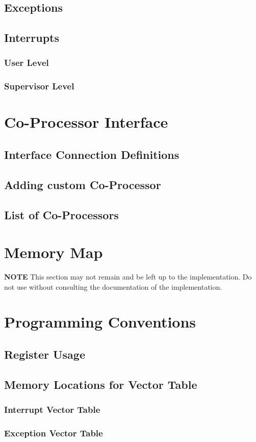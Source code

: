 \documentclass[letterpaper]{article}
\begin{document}
\subsection{Exceptions}


\subsection{Interrupts}
\subsubsection{User Level}
\subsubsection{Supervisor Level}

\section{Co-Processor Interface}
\subsection{Interface Connection Definitions}
\subsection{Adding custom Co-Processor}
\subsection{List of Co-Processors}

\section{Memory Map}
\textbf{NOTE}
This section may not remain and be left up to the implementation. Do not use without consulting
the documentation of the implementation.
\section{Programming Conventions}
\subsection{Register Usage}
\subsection{Memory Locations for Vector Table}
\subsubsection{Interrupt Vector Table}
\subsubsection{Exception Vector Table}
\end{document}
